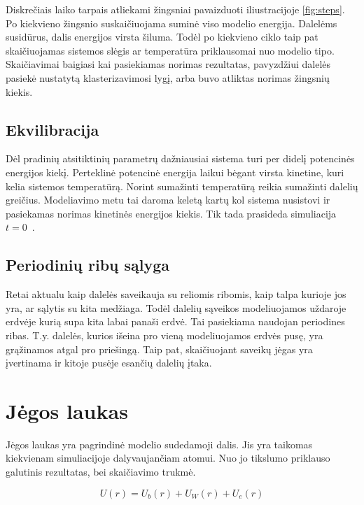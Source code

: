 \documentclass[runningheads]{llncs}
\begin{document}
Diskrečiais laiko tarpais atliekami žingsniai pavaizduoti iliustracijoje \ref{fig:steps}.
Po kiekvieno žingsnio suskaičiuojama suminė viso modelio energija.
Dalelėms susidūrus, dalis energijos virsta šiluma.
Todėl po kiekvieno ciklo taip pat skaičiuojamas sistemos slėgis ar temperatūra priklausomai nuo modelio tipo.
Skaičiavimai baigiasi kai pasiekiamas norimas rezultatas, pavyzdžiui dalelės pasiekė nustatytą klasterizavimosi lygį,
arba buvo atliktas norimas žingsnių kiekis.


\subsection{Ekvilibracija}

Dėl pradinių atsitiktinių parametrų dažniausiai sistema turi per didelį potencinės energijos kiekį.
Perteklinė potencinė energija laikui bėgant virsta kinetine, kuri kelia sistemos temperatūrą.
Norint sumažinti temperatūrą reikia sumažinti dalelių greičius.
Modeliavimo metu tai daroma keletą kartų kol sistema nusistovi ir pasiekamas norimas kinetinės energijos kiekis.
Tik tada prasideda simuliacija \(t = 0\)~\cite{ref_hitch}.


\subsection{Periodinių ribų sąlyga}

Retai aktualu kaip dalelės saveikauja su reliomis ribomis, kaip talpa kurioje jos yra, ar sąlytis su kita medžiaga.
Todėl dalelių sąveikos modeliuojamos uždaroje erdvėje kurią supa kita labai panaši erdvė.
Tai pasiekiama naudojan periodines ribas. T.y. dalelės, kurios išeina pro vieną modeliuojamos erdvės pusę,
yra grąžinamos atgal pro priešingą.
Taip pat, skaičiuojant saveikų jėgas yra įvertinama ir kitoje pusėje esančių dalelių įtaka.


\section{Jėgos laukas}
\label{ref_force_field}

Jėgos laukas yra pagrindinė modelio sudedamoji dalis.
Jis yra taikomas kiekvienam simuliacijoje dalyvaujančiam atomui.
Nuo jo tikslumo priklauso galutinis rezultatas, bei skaičiavimo trukmė.

\begin{equation} \label{eq:upot}
    U(r) = U_b(r) + U_W(r) + U_e(r)
\end{equation}
\end{document}
